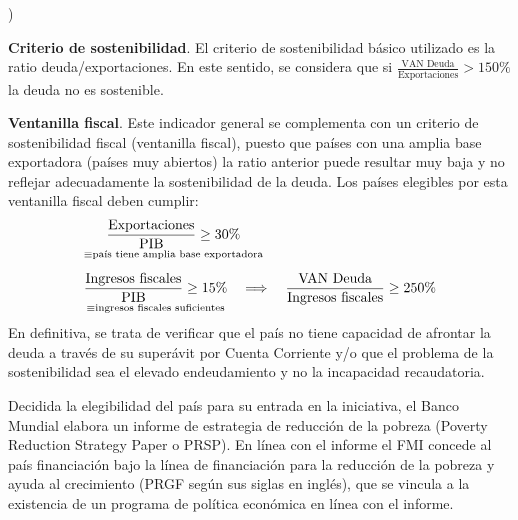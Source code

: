 \documentclass[10pt,a4paper]{article}
\newcounter{alphaitem}
\newenvironment{la}
      {\begin{list}{\alph{alphaitem})}{%
          \usecounter{alphaitem}%
          \setlength{\leftmargin}{1cm}%
          \setlength{\parskip}{3pt}%
          \setlength{\itemsep}{0pt}%
          \setlength{\parsep}{0pt}%
      }}
      {\end{list}}
\begin{document}
\begin{la}
    \item \textbf{Criterio de sostenibilidad}. El criterio de sostenibilidad básico utilizado es la ratio deuda/exportaciones. En este sentido, se considera que si $\frac{\text{VAN Deuda}}{\text{Exportaciones}}>150\%$ la deuda no es sostenible. 
    \item \textbf{Ventanilla fiscal}. Este indicador general se complementa con un criterio de sostenibilidad fiscal (ventanilla fiscal), puesto que países con una amplia base exportadora (países muy abiertos) la ratio anterior puede resultar muy baja y no reflejar adecuadamente la sostenibilidad de la deuda. Los países elegibles por esta ventanilla fiscal deben cumplir:
    $$\begin{aligned}
        &\underset{\equiv\scriptsize{\text{país tiene amplia base exportadora}}}{\frac{\text{Exportaciones}}{\text{PIB}}\geq 30\%}\\[0.5em]
        &\underset{\equiv\scriptsize{\text{ingresos fiscales suficientes}}}{\frac{\text{Ingresos fiscales}}{\text{PIB}}\geq 15\%}\quad\Longrightarrow\quad \frac{\text{VAN Deuda}}{\text{Ingresos fiscales}}\geq 250\%
    \end{aligned}$$
    En definitiva, se trata de verificar que el país no tiene capacidad de afrontar la deuda a través de su superávit por Cuenta Corriente y/o que el problema de la sostenibilidad sea el elevado endeudamiento y no la incapacidad recaudatoria. 
\end{la}

Decidida la elegibilidad del país para su entrada en la iniciativa, el Banco Mundial elabora un informe de estrategia de reducción de la pobreza (Poverty Reduction Strategy Paper o PRSP). En línea con el informe el FMI concede al país financiación bajo la línea de financiación para la reducción de la pobreza y ayuda al crecimiento (PRGF según sus siglas en inglés), que se vincula a la existencia de un programa de política económica en línea con el informe. 
\end{document}
